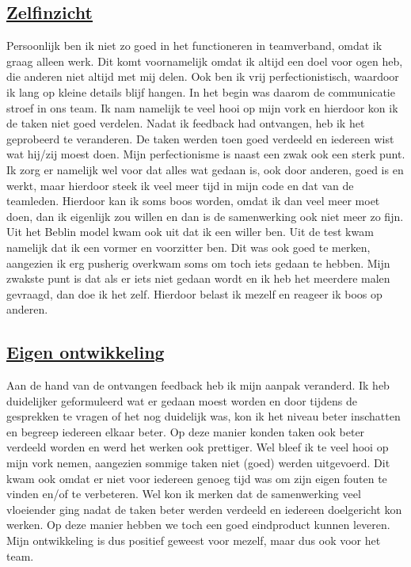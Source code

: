 \documentclass[12pt,a4paper,oneside]{article}
\begin{document}
\subsection*{\underline{Zelfinzicht}}

Persoonlijk ben ik niet zo goed in het functioneren in teamverband, omdat ik graag alleen werk. Dit komt voornamelijk omdat ik altijd een doel voor ogen heb, die anderen niet altijd met mij delen. Ook ben ik vrij perfectionistisch, waardoor ik lang op kleine details blijf hangen. In het begin was daarom de communicatie stroef in ons team. Ik nam namelijk te veel hooi op mijn vork en hierdoor kon ik de taken niet goed verdelen. Nadat ik feedback had ontvangen, heb ik het geprobeerd te veranderen. De taken werden toen goed verdeeld en iedereen wist wat hij/zij moest doen. Mijn perfectionisme is naast een zwak ook een sterk punt. Ik zorg er namelijk wel voor dat alles wat gedaan is, ook door anderen, goed is en werkt, maar hierdoor steek ik veel meer tijd in mijn code en dat van de teamleden. Hierdoor kan ik soms boos worden, omdat ik dan veel meer moet doen, dan ik eigenlijk zou willen en dan is de samenwerking ook niet meer zo fijn. \\

Uit het Beblin model kwam ook uit dat ik een willer ben. Uit de test kwam namelijk dat ik een vormer en voorzitter ben. Dit was ook goed te merken, aangezien ik erg pusherig overkwam soms om toch iets gedaan te hebben. Mijn zwakste punt is dat als er iets niet gedaan wordt en ik heb het meerdere malen gevraagd, dan doe ik het zelf. Hierdoor belast ik mezelf en reageer ik boos op anderen.   

\subsection*{\underline{Eigen ontwikkeling}}

Aan de hand van de ontvangen feedback heb ik mijn aanpak veranderd. Ik heb duidelijker geformuleerd wat er gedaan moest worden en door tijdens de gesprekken te vragen of het nog duidelijk was, kon ik het niveau beter inschatten en begreep iedereen elkaar beter. Op deze manier konden taken ook beter verdeeld worden en werd het werken ook prettiger. Wel bleef ik te veel hooi op mijn vork nemen, aangezien sommige taken niet (goed) werden uitgevoerd. Dit kwam ook omdat er niet voor iedereen genoeg tijd was om zijn eigen fouten te vinden en/of te verbeteren. Wel kon ik merken dat de samenwerking veel vloeiender ging nadat de taken beter werden verdeeld en iedereen doelgericht kon werken. Op deze manier hebben we toch een goed eindproduct kunnen leveren. Mijn ontwikkeling is dus positief geweest voor mezelf, maar dus ook voor het team. 
\end{document}
